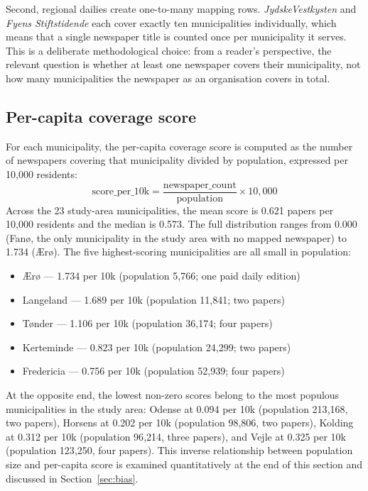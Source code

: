 \documentclass[12pt, a4paper]{article}
\begin{document}
Second, regional dailies create one-to-many mapping rows. \emph{JydskeVestkysten} and \emph{Fyens Stiftstidende} each cover exactly ten municipalities individually, which means that a single newspaper title is counted once per municipality it serves. This is a deliberate methodological choice: from a reader's perspective, the relevant question is whether at least one newspaper covers their municipality, not how many municipalities the newspaper as an organisation covers in total.

\subsection{Per-capita coverage score}
For each municipality, the per-capita coverage score is computed as the number of
newspapers covering that municipality divided by population, expressed per 10{,}000
residents:
\begin{equation*}
    \text{score\_per\_10k} = \frac{\text{newspaper\_count}}{\text{population}} \times 10{,}000
\end{equation*}
Across the 23 study-area municipalities, the mean score is 0.621 papers per 10{,}000
residents and the median is 0.573. The full distribution ranges from 0.000 (Fanø,
the only municipality in the study area with no mapped newspaper) to 1.734 (Ærø).
The five highest-scoring municipalities are all small in population:
\begin{itemize}
    \item Ærø --- 1.734 per 10k (population 5{,}766; one paid daily edition)
    \item Langeland --- 1.689 per 10k (population 11{,}841; two papers)
    \item Tønder --- 1.106 per 10k (population 36{,}174; four papers)
    \item Kerteminde --- 0.823 per 10k (population 24{,}299; two papers)
    \item Fredericia --- 0.756 per 10k (population 52{,}939; four papers)
\end{itemize}
At the opposite end, the lowest non-zero scores belong to the most populous municipalities in the study area: Odense at 0.094 per 10k (population 213{,}168, two papers), Horsens at 0.202 per 10k (population 98{,}806, two papers), Kolding at 0.312 per 10k (population 96{,}214, three papers), and Vejle at 0.325 per 10k (population 123{,}250, four papers). This inverse relationship between population size and per-capita score is examined quantitatively at the end of this section and discussed in Section~\ref{sec:bias}.
\end{document}
